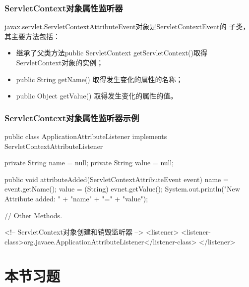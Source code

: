 \begin{frame}[fragile] %
\frametitle{ServletContext对象属性监听器}

javax.servlet.ServletContextAttributeEvent对象是ServletContextEvent的
子类，其主要方法包括：

\begin{itemize}
\item 继承了父类方法public ServletContext getServletContext()取得
ServletContext对象的实例；
\item public String getName() 取得发生变化的属性的名称；
\item public Object getValue() 取得发生变化的属性的值。
\end{itemize}
\end{frame}

\begin{frame}[fragile] %
\frametitle{ServletContext对象属性监听器示例}


\begin{javaCode}
  public class ApplicationAttributeListener implements
  ServletContextAttributeListener {
    private String name = null;
    private String value = null;
    
    public void attributeAdded(ServletContextAttributeEvent event) {
      name = event.getName();
      value = (String) evnet.getValue();
      System.out.println("New Attribute added: " + "name" + "=" + "value");
    }

    // Other Methods.

  }
\end{javaCode}

\begin{xmlCode}
  <!-- ServletContext对象创建和销毁监听器 -->
  <listener>
    <listener-class>org.javaee.ApplicationAttributeListener</listener-class>
  </listener> 
\end{xmlCode}
\end{frame}

\section{本节习题}

